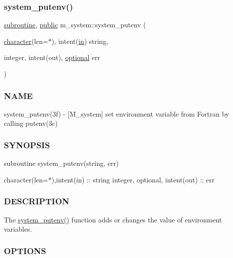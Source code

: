 \subsubsection{\texorpdfstring{system\+\_\+putenv()}{system\_putenv()}}
{\footnotesize\ttfamily \hyperlink{M__stopwatch_83_8txt_acfbcff50169d691ff02d4a123ed70482}{subroutine}, \hyperlink{M__stopwatch_83_8txt_a2f74811300c361e53b430611a7d1769f}{public} m\+\_\+system\+::system\+\_\+putenv (\begin{DoxyParamCaption}\item[{\hyperlink{option__stopwatch_83_8txt_abd4b21fbbd175834027b5224bfe97e66}{character}(len=$\ast$), intent(\hyperlink{M__journal_83_8txt_afce72651d1eed785a2132bee863b2f38}{in})}]{string,  }\item[{integer, intent(out), \hyperlink{option__stopwatch_83_8txt_aa4ece75e7acf58a4843f70fe18c3ade5}{optional}}]{err }\end{DoxyParamCaption})}



\subsubsection*{N\+A\+ME}

system\+\_\+putenv(3f) -\/ \mbox{[}M\+\_\+system\mbox{]} set environment variable from Fortran by calling putenv(3c) 

\subsubsection*{S\+Y\+N\+O\+P\+S\+IS}

\begin{DoxyVerb}subroutine system_putenv(string, err)

 character(len=*),intent(in)    :: string
 integer, optional, intent(out) :: err
\end{DoxyVerb}


\subsubsection*{D\+E\+S\+C\+R\+I\+P\+T\+I\+ON}

The \hyperlink{namespacem__system_af0c9df8e59cac9cd617cd1e20448ea7d}{system\+\_\+putenv()} function adds or changes the value of environment variables.

\subsubsection*{O\+P\+T\+I\+O\+NS}

